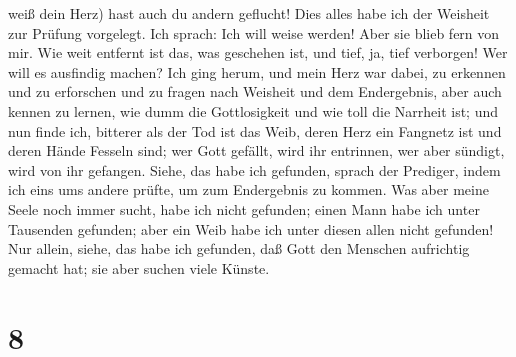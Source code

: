 weiß dein Herz) hast auch du andern geflucht!  Dies alles
habe ich der Weisheit zur Prüfung vorgelegt. Ich sprach: Ich will weise
werden! Aber sie blieb fern von mir.  Wie weit entfernt
ist das, was geschehen ist, und tief, ja, tief verborgen! Wer will es
ausfindig machen?  Ich ging herum, und mein Herz war
dabei, zu erkennen und zu erforschen und zu fragen nach Weisheit und dem
Endergebnis, aber auch kennen zu lernen, wie dumm die Gottlosigkeit und
wie toll die Narrheit ist;  und nun finde ich, bitterer
als der Tod ist das Weib, deren Herz ein Fangnetz ist und deren Hände
Fesseln sind; wer Gott gefällt, wird ihr entrinnen, wer aber sündigt,
wird von ihr gefangen.  Siehe, das habe ich gefunden,
sprach der Prediger, indem ich eins ums andere prüfte, um zum
Endergebnis zu kommen.  Was aber meine Seele noch immer
sucht, habe ich nicht gefunden; einen Mann habe ich unter Tausenden
gefunden; aber ein Weib habe ich unter diesen allen nicht gefunden!
 Nur allein, siehe, das habe ich gefunden, daß Gott den
Menschen aufrichtig gemacht hat; sie aber suchen viele Künste.

\hypertarget{section-7}{%
\section{8}\label{section-7}}

